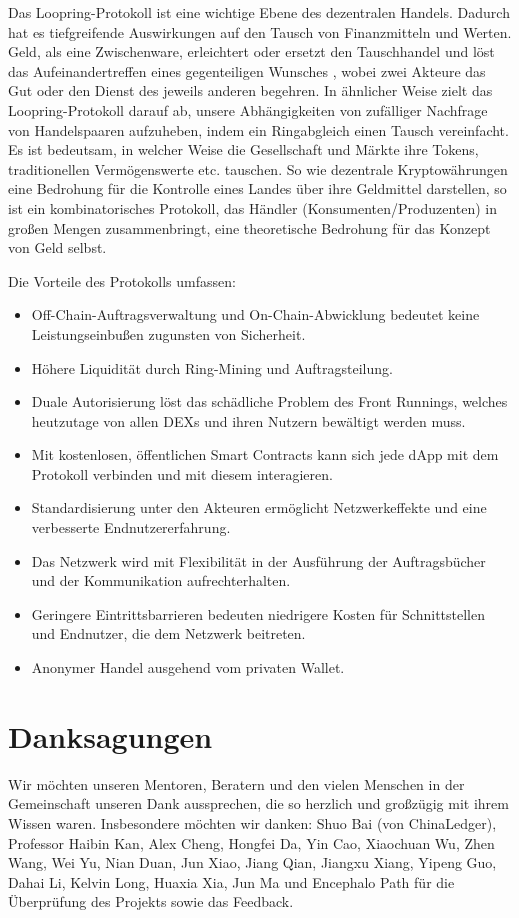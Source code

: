 \documentclass[UTF8,nofonts]{article}
\begin{document}
\begin{multicols}{2}
Das Loopring-Protokoll ist eine wichtige Ebene des dezentralen Handels. Dadurch hat es tiefgreifende Auswirkungen auf den Tausch von Finanzmitteln und Werten. Geld, als eine Zwischenware, erleichtert oder ersetzt den Tauschhandel und löst das Aufeinandertreffen eines gegenteiligen Wunsches \cite{unenumerated2006}, wobei zwei Akteure das Gut oder den Dienst des jeweils anderen begehren. In ähnlicher Weise zielt das Loopring-Protokoll darauf ab, unsere Abhängigkeiten von zufälliger Nachfrage von Handelspaaren aufzuheben, indem ein Ringabgleich einen Tausch vereinfacht. Es ist bedeutsam, in welcher Weise die Gesellschaft und Märkte ihre Tokens, traditionellen Vermögenswerte etc. tauschen. So wie dezentrale Kryptowährungen eine Bedrohung für die Kontrolle eines Landes über ihre Geldmittel darstellen, so ist ein kombinatorisches Protokoll, das Händler (Konsumenten/Produzenten) in großen Mengen zusammenbringt, eine theoretische Bedrohung für das Konzept von Geld selbst.

Die Vorteile des Protokolls umfassen:

\begin{itemize}
	\item Off-Chain-Auftragsverwaltung und On-Chain-Abwicklung bedeutet keine Leistungseinbußen zugunsten von Sicherheit.
	\item Höhere Liquidität durch Ring-Mining und Auftragsteilung.
	\item Duale Autorisierung löst das schädliche Problem des Front Runnings, welches heutzutage von allen DEXs und ihren Nutzern bewältigt werden muss.
	\item Mit kostenlosen, öffentlichen Smart Contracts kann sich jede dApp mit dem Protokoll verbinden und mit diesem interagieren.
	\item Standardisierung unter den Akteuren ermöglicht Netzwerkeffekte und eine verbesserte Endnutzererfahrung.
	\item Das Netzwerk wird mit Flexibilität in der Ausführung der Auftragsbücher und der Kommunikation aufrechterhalten.
	\item Geringere Eintrittsbarrieren bedeuten niedrigere Kosten für Schnittstellen und Endnutzer, die dem Netzwerk beitreten.
	\item Anonymer Handel ausgehend vom privaten Wallet.
\end{itemize}

\section{Danksagungen}
Wir möchten unseren Mentoren, Beratern und den vielen Menschen in der Gemeinschaft unseren Dank aussprechen, die so herzlich und großzügig mit ihrem Wissen waren. Insbesondere möchten wir danken: Shuo Bai (von ChinaLedger), Professor Haibin Kan, Alex Cheng, Hongfei Da, Yin Cao, Xiaochuan Wu, Zhen Wang, Wei Yu, Nian Duan, Jun Xiao, Jiang Qian, Jiangxu Xiang, Yipeng Guo, Dahai Li, Kelvin Long, Huaxia Xia, Jun Ma und Encephalo Path für die Überprüfung des Projekts sowie das Feedback.






\end{multicols}
\end{document}
